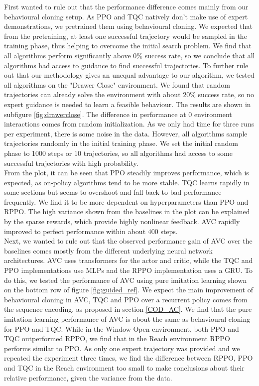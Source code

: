 First wanted to rule out that the performance difference comes mainly from our behavioural cloning setup. As PPO and TQC natively don't make use of expert demonstrations,
we pretrained them using behavioural cloning. We expected that from the pretraining, at least one successful trajectory would be sampled in the training phase, thus
helping to overcome the initial search problem. We find that all algorithms perform significantly above $0\%$ success rate, so we conclude that all algorithms had
access to guidance to find successful trajectories. To further rule out that our methodology gives an unequal advantage to our algorithm, we tested all algorithms on the
"Drawer Close" environment. We found that random trajectories can already solve the environment with about $20\%$ success rate, so no expert guidance is needed to learn a feasible behaviour.
The results are shown in subfigure \ref{fig:drawerclose}. The difference in performance at 0 environment interactions comes from random initialization. As we only had time for three runs per
experiment, there is some noise in the data. However, all algorithms sample trajectories randomly in the initial training phase. We set the initial random phase to
1000 steps or 10 trajectories, so all algorithms had access to some successful trajectories with high probability. \\

From the plot, it can be seen that PPO steadily improves performance, which is expected, as on-policy algorithms tend to be more stable.
TQC learns rapidly in some sections but seems to overshoot and fall back to bad performance frequently.
We find it to be more dependent on hyperparameters than PPO and RPPO.
The high variance shown from the baselines in the plot can be explained by the sparse rewards, which provide highly nonlinear feedback.
AVC rapidly improved to perfect performance within about 400 steps. \\

Next, we wanted to rule out that the observed performance gain of AVC over the baselines comes mostly from the different underlying neural network architectures. AVC uses transformers for the actor and
critic, while the TQC and PPO implementations use MLPs and the RPPO implementation uses a GRU. To do this, we tested the performance of AVC using pure imitation learning shown on the bottom row of
figure \ref{fig:guided_ref}. We expect the main improvement of behavioural cloning in AVC, TQC and PPO over a recurrent policy comes from the sequence encoding, as proposed in section \ref{COD_AC}.
We find that the pure imitation learning performance
of AVC is about the same as behavioural cloning for PPO and TQC. While in the Window Open environment, both PPO and TQC outperformed RPPO, we find that in the Reach environment RPPO performs
similar to PPO. As only one expert trajectory was provided and we repeated the experiment three times, we find the difference between RPPO, PPO and TQC in the Reach
environment too small to make conclusions about their relative performance, given the variance from the data. \\

